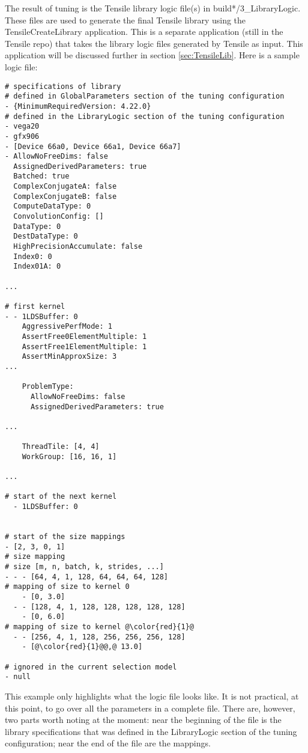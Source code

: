 \documentclass[]{article}
\begin{document}
\noindent
The result of tuning is the Tensile library logic file(s) in build*/3\_LibraryLogic. These files are used to generate the final Tensile library using the TensileCreateLibrary application. This is a separate application (still in the Tensile repo) that takes the library logic files generated by Tensile as input. This application will be discussed further in section \ref{sec:TensileLib}. Here is a sample logic file:

\begin{verbatim}
# specifications of library
# defined in GlobalParameters section of the tuning configuration
- {MinimumRequiredVersion: 4.22.0}
# defined in the LibraryLogic section of the tuning configuration
- vega20
- gfx906
- [Device 66a0, Device 66a1, Device 66a7]
- AllowNoFreeDims: false
  AssignedDerivedParameters: true
  Batched: true
  ComplexConjugateA: false
  ComplexConjugateB: false
  ComputeDataType: 0
  ConvolutionConfig: []
  DataType: 0
  DestDataType: 0
  HighPrecisionAccumulate: false
  Index0: 0
  Index01A: 0

...

# first kernel
- - 1LDSBuffer: 0
    AggressivePerfMode: 1
    AssertFree0ElementMultiple: 1
    AssertFree1ElementMultiple: 1
    AssertMinApproxSize: 3
...

    ProblemType:
      AllowNoFreeDims: false
      AssignedDerivedParameters: true

...

    ThreadTile: [4, 4]
    WorkGroup: [16, 16, 1]

...

# start of the next kernel
  - 1LDSBuffer: 0


# start of the size mappings
- [2, 3, 0, 1]
# size mapping
# size [m, n, batch, k, strides, ...]
- - - [64, 4, 1, 128, 64, 64, 64, 128]
# mapping of size to kernel 0
    - [0, 3.0]
  - - [128, 4, 1, 128, 128, 128, 128, 128]
    - [0, 6.0]
# mapping of size to kernel @\color{red}{1}@
  - - [256, 4, 1, 128, 256, 256, 256, 128]
    - [@\color{red}{1}@@,@ 13.0]

# ignored in the current selection model
- null

\end{verbatim}
\noindent
This example only highlights what the logic file looks like. It is not practical, at this point, to go over all the parameters in a complete file. There are, however, two parts worth noting at the moment: near the beginning of the file is the library specifications that was defined in the LibraryLogic section of the tuning configuration; near the end of the file are the mappings.
\end{document}
